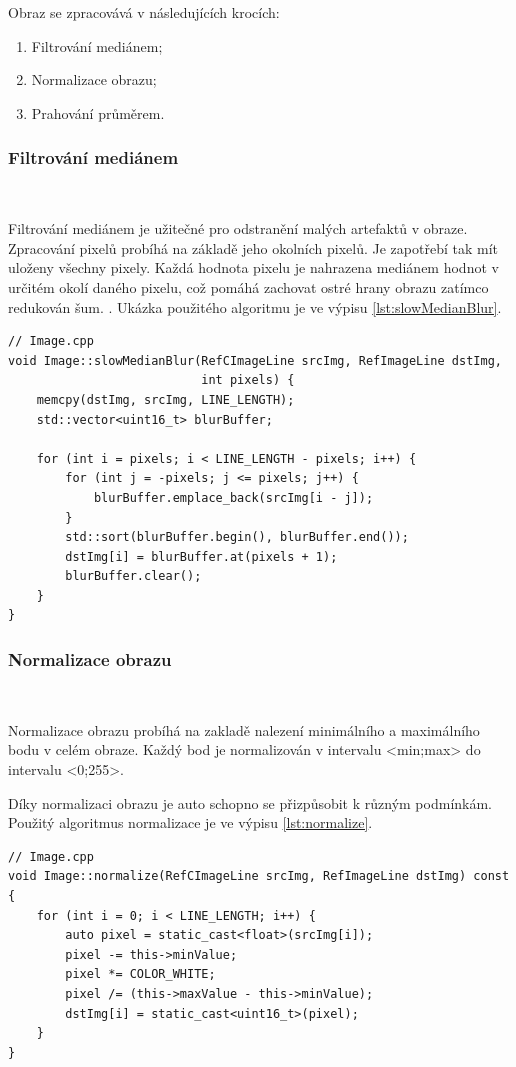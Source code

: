 Obraz se zpracovává v následujících krocích:
\begin{enumerate}
    \item Filtrování mediánem;
    \item Normalizace obrazu;
    \item Prahování průměrem.
\end{enumerate}

\subsubsection*{Filtrování mediánem}\

Filtrování mediánem je užitečné pro odstranění malých artefaktů v obraze.
Zpracování pixelů probíhá na základě jeho okolních pixelů.
Je zapotřebí tak mít uloženy všechny pixely. Každá hodnota
pixelu je nahrazena mediánem hodnot v určitém okolí daného pixelu,
což pomáhá zachovat ostré hrany obrazu zatímco redukován šum.
. Ukázka použitého algoritmu je ve výpisu \ref{lst:slowMedianBlur}\cite{draha}\cite{robot}.

\begin{lstlisting}[caption=Filtrování mediánem, label=lst:slowMedianBlur]
// Image.cpp
void Image::slowMedianBlur(RefCImageLine srcImg, RefImageLine dstImg,
                           int pixels) {
    memcpy(dstImg, srcImg, LINE_LENGTH);
    std::vector<uint16_t> blurBuffer;

    for (int i = pixels; i < LINE_LENGTH - pixels; i++) {
        for (int j = -pixels; j <= pixels; j++) {
            blurBuffer.emplace_back(srcImg[i - j]);
        }
        std::sort(blurBuffer.begin(), blurBuffer.end());
        dstImg[i] = blurBuffer.at(pixels + 1);
        blurBuffer.clear();
    }
}
\end{lstlisting}


\subsubsection*{Normalizace obrazu}\

Normalizace obrazu probíhá na zakladě nalezení minimálního a
maximálního bodu v celém obraze. Každý bod je normalizován v 
intervalu <min;max> do intervalu <0;255>.

Díky normalizaci obrazu je auto schopno se přizpůsobit k různým  
podmínkám. Použitý algoritmus normalizace je ve výpisu \ref{lst:normalize}\cite{robot}.
\begin{lstlisting}[caption=Normalizace obrazu, label=lst:normalize]
// Image.cpp
void Image::normalize(RefCImageLine srcImg, RefImageLine dstImg) const {
    for (int i = 0; i < LINE_LENGTH; i++) {
        auto pixel = static_cast<float>(srcImg[i]);
        pixel -= this->minValue;
        pixel *= COLOR_WHITE;
        pixel /= (this->maxValue - this->minValue);
        dstImg[i] = static_cast<uint16_t>(pixel);
    }
}
\end{lstlisting}

